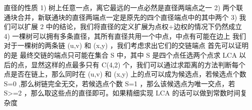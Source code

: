 {}\markdownRendererInterblockSeparator
{}直径的性质\markdownRendererParagraphSeparator
{}\markdownRendererDollarSign{} 1) \markdownRendererDollarSign{}树上任意一点，离它最远的一点必然是直径两端点之一\markdownRendererParagraphSeparator
{}\markdownRendererDollarSign{} 2) \markdownRendererDollarSign{}两个联通块合并，新联通块的直径两端点一定是原先的四个直径端点中的其中两个\markdownRendererParagraphSeparator
{}\markdownRendererDollarSign{} 3) \markdownRendererDollarSign{}我们可以扩展\markdownRendererDollarSign{} 2 \markdownRendererDollarSign{}中的结论，我们将直径的定义扩展为点权+边权的情况下仍然成立\markdownRendererParagraphSeparator
{}\markdownRendererDollarSign{} 4) \markdownRendererDollarSign{}一棵树可以拥有多条直径，其所有直径共用一个中点，中点有可能在边上\markdownRendererInterblockSeparator
{}
\markdownRendererSectionEnd \markdownRendererSectionBegin
{}\markdownRendererInterblockSeparator
{}我们对于一棵树的两条链\markdownRendererDollarSign{} (u,v) \markdownRendererDollarSign{}和\markdownRendererDollarSign{} (x,y) \markdownRendererDollarSign{}，我们考虑求出它们的交链端点\markdownRendererParagraphSeparator
{}首先可以证明的是 最终交链的端点只可能在集合\markdownRendererDollarSign{} S \markdownRendererDollarSign{}中，其中\markdownRendererDollarSign{} S \markdownRendererDollarSign{}是四个点任选两个点求\markdownRendererDollarSign{} LCA \markdownRendererDollarSign{}以后的点，显然这样的点最多只有\markdownRendererDollarSign{} C(4,2) \markdownRendererDollarSign{}个，我们可以通过求距离的方法判断每个点是否在链上，那么同时在\markdownRendererDollarSign{} (u,v) \markdownRendererDollarSign{}和\markdownRendererDollarSign{} (x,y) \markdownRendererDollarSign{}上的点可以成为候选点，若候选点个数\markdownRendererDollarSign{} \markdownRendererPipe{}S\markdownRendererPipe{}=0 \markdownRendererDollarSign{},那么树链完全无交，若候选点个数\markdownRendererDollarSign{} \markdownRendererPipe{}S\markdownRendererPipe{}=1 \markdownRendererDollarSign{}，那么该候选点为唯一交点，若\markdownRendererDollarSign{} \markdownRendererPipe{}S\markdownRendererPipe{}>=2 \markdownRendererDollarSign{}，那么取这些点的直径即可。如果精细实现\markdownRendererDollarSign{} LCA \markdownRendererDollarSign{}的话可以做到常数时间复杂度\markdownRendererInterblockSeparator
{}\markdownRendererInterblockSeparator
{}
\markdownRendererSectionEnd \markdownRendererSectionBegin
{}\markdownRendererInterblockSeparator
